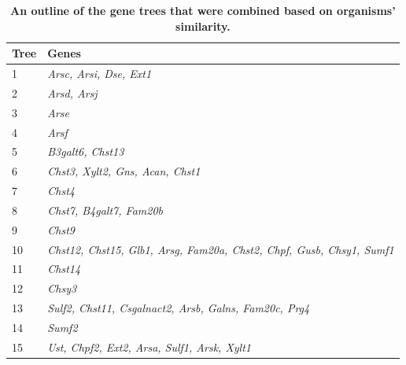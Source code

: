 \documentclass{article}
\begin{document}
\begin{table}[]
\begin{tabular}{ll}
\hline
\textbf{Tree} & \textbf{Genes}													\\ 
\hline
\hline
1             & \textit{Arsc, Arsi, Dse, Ext1}                                               						\\
2             & \textit{Arsd, Arsj}                                                          						\\
3             & \textit{Arse}                                                                							\\
4             & \textit{Arsf}                                                                							\\
5             & \textit{B3galt6, Chst13}                                                     						\\
6             & \textit{Chst3, Xylt2, Gns, Acan, Chst1}                                      					\\
7             & \textit{Chst4}                                                               						\\
8             & \textit{Chst7, B4galt7, Fam20b}                                              					\\
9             & \textit{Chst9}                                                               						\\
10            & \textit{Chst12, Chst15, Glb1, Arsg, Fam20a, Chst2, Chpf, Gusb, Chsy1, Sumf1} 	\\
11            & \textit{Chst14}                                                              						\\
12            & \textit{Chsy3}                                                               						\\
13            & \textit{Sulf2, Chst11, Csgalnact2, Arsb, Galns, Fam20c, Prg4}                			\\
14            & \textit{Sumf2}                                                               						\\
15            & \textit{Ust, Chpf2, Ext2, Arsa, Sulf1, Arsk, Xylt1}                          				\\ 
\hline
\end{tabular}
\caption{\textbf{An outline of the gene trees that were combined based on organisms' similarity.}}
\label{tab_1}
\end{table}
\end{document}
